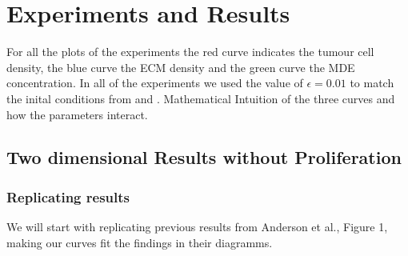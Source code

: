 

\section{Experiments and Results}
For all the plots of the experiments the red curve indicates the tumour cell density, the blue curve the ECM density and the green curve the MDE concentration. In all of the experiments we used the value of $\epsilon = 0.01$ to match the inital conditions from \cite{anderson_mathematical_2000} and \cite{Kolev2010}. \newline 
Mathematical Intuition of the three curves and how the parameters interact.


\subsection{Two dimensional Results without Proliferation}
\subsubsection{Replicating results}
We will start with replicating previous results from Anderson et al.\cite{anderson_mathematical_2000}, Figure 1, making our curves fit the findings in their diagramms. 


